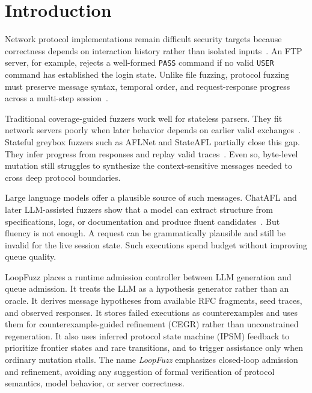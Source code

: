 \documentclass[final,5p,times,number]{elsarticle}
\begin{document}
\section{Introduction}
Network protocol implementations remain difficult security targets because correctness depends on interaction history rather than isolated inputs~\cite{aflnet,stateafl,sgf_usenix22,formatted_stateful_greybox_fuzzing_2024,resolverfuzz_query_response_2024}. An FTP server, for example, rejects a well-formed \texttt{PASS} command if no valid \texttt{USER} command has established the login state. Unlike file fuzzing, protocol fuzzing must preserve message syntax, temporal order, and request-response progress across a multi-step session~\cite{resolverfuzz_query_response_2024,mbfuzzer_mqtt_2025,bleem_packet_sequence_2023,logos_log_guided_fuzzing_2024,diane_identifying_fuzzing_triggers_2021,corecrisis_context_aware_2025}.

Traditional coverage-guided fuzzers work well for stateless parsers. They fit network servers poorly when later behavior depends on earlier valid exchanges~\cite{directed_greybox_fuzzing_2017,seed_selection_successful_fuzzing_2021,one_fuzzing_strategy_rule_2022,regression_greybox_fuzzing_2021,efficient_errors_2022}. Stateful greybox fuzzers such as AFLNet and StateAFL partially close this gap. They infer progress from responses and replay valid traces~\cite{aflnet,stateafl,sgf_usenix22,profuzzbench_benchmark_stateful_protocol_2021,snapfuzz_high_throughput_fuzzing_2022,bleem_packet_sequence_2023,formatted_stateful_greybox_fuzzing_2024}. Even so, byte-level mutation still struggles to synthesize the context-sensitive messages needed to cross deep protocol boundaries.

Large language models offer a plausible source of such messages. ChatAFL and later LLM-assisted fuzzers show that a model can extract structure from specifications, logs, or documentation and produce fluent candidates~\cite{chatafl,fuzz4all_universal_fuzzing_large_2024,llmif_augmented_large_language_2024,matter_llm_specification_2024,carpetfuzz_documentation_2023,prompt_fuzzing_fuzz_driver_2024,large_language_models_are_2023,large_language_models_are_2024}. But fluency is not enough. A request can be grammatically plausible and still be invalid for the live session state. Such executions spend budget without improving queue quality.

LoopFuzz places a runtime admission controller between LLM generation and queue admission. It treats the LLM as a hypothesis generator rather than an oracle. It derives message hypotheses from available RFC fragments, seed traces, and observed responses. It stores failed executions as counterexamples and uses them for counterexample-guided refinement (CEGR) rather than unconstrained regeneration. It also uses inferred protocol state machine (IPSM) feedback to prioritize frontier states and rare transitions, and to trigger assistance only when ordinary mutation stalls. The name \emph{LoopFuzz} emphasizes closed-loop admission and refinement, avoiding any suggestion of formal verification of protocol semantics, model behavior, or server correctness.
\end{document}
